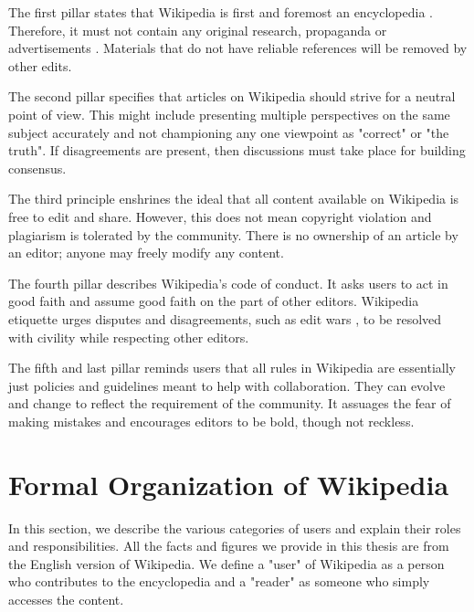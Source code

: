The first pillar states that Wikipedia is first and foremost an encyclopedia \cite{wiki:wiki-is-not}.
Therefore, it must not contain any original research, propaganda or advertisements \cite{wiki:wiki-NOR}.
Materials that do not have reliable references will be removed by other edits.

The second pillar specifies that articles on Wikipedia should strive for a neutral point of view.
This might include presenting multiple perspectives on the same subject accurately and not championing any one viewpoint as "correct" or "the truth".
If disagreements are present, then discussions must take place for building consensus.

The third principle enshrines the ideal that all content available on Wikipedia is free to edit and share.
However, this does not mean copyright violation and plagiarism is tolerated by the community.
There is no ownership of an article by an editor; anyone may freely modify any content.

The fourth pillar describes Wikipedia's code of conduct.
It asks users to act in good faith and assume good faith on the part of other editors.
Wikipedia etiquette urges disputes and disagreements, such as edit wars \cite{wiki:edit-wars}, to be resolved with civility while respecting other editors.

The fifth and last pillar reminds users that all rules in Wikipedia are essentially just policies and guidelines meant to help with collaboration.
They can evolve and change to reflect the requirement of the community.
It assuages the fear of making mistakes and encourages editors to be bold, though not reckless. 

\section{Formal Organization of Wikipedia}
\label{sec:formal-org-wikipedia}
In this section, we describe the various categories of users and explain their roles and responsibilities.
All the facts and figures we provide in this thesis are from the English version of Wikipedia.
We define a "user" of Wikipedia as a person who contributes to the encyclopedia and a "reader" as someone who simply accesses the content.

